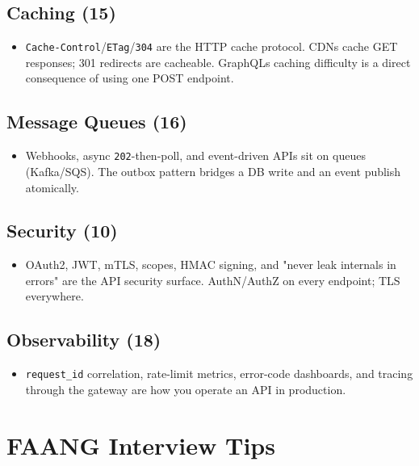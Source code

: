 \documentclass[11pt]{article}
\providecommand{\tightlist}{\setlength{\itemsep}{1pt}\setlength{\parskip}{0pt}}
\begin{document}
\subsection{Caching (15)}\label{caching-15}

\begin{itemize}
\tightlist
\item
  \texttt{Cache-Control}/\texttt{ETag}/\texttt{304} are the HTTP cache protocol. CDNs cache GET responses; 301 redirects are cacheable. GraphQL\textquotesingle s caching difficulty is a direct consequence of using one POST endpoint.
\end{itemize}

\subsection{Message Queues (16)}\label{message-queues-16}

\begin{itemize}
\tightlist
\item
  Webhooks, async \texttt{202}-then-poll, and event-driven APIs sit on queues (Kafka/SQS). The outbox pattern bridges a DB write and an event publish atomically.
\end{itemize}

\subsection{Security (10)}\label{security-10}

\begin{itemize}
\tightlist
\item
  OAuth2, JWT, mTLS, scopes, HMAC signing, and "never leak internals in errors" are the API security surface. AuthN/AuthZ on every endpoint; TLS everywhere.
\end{itemize}

\subsection{Observability (18)}\label{observability-18}

\begin{itemize}
\tightlist
\item
  \texttt{request\_id} correlation, rate-limit metrics, error-code dashboards, and tracing through the gateway are how you operate an API in production.
\end{itemize}

\section{FAANG Interview Tips}\label{faang-interview-tips}
\end{document}
